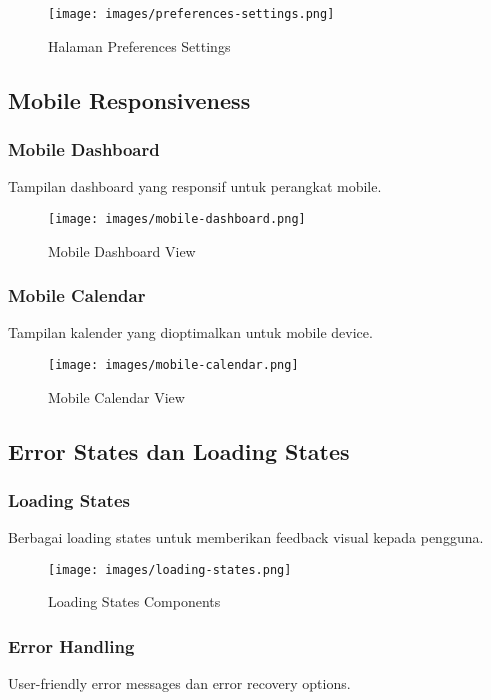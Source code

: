 \begin{figure}[H]
\centering
\texttt{[image: images/preferences-settings.png]}
\caption{Halaman Preferences Settings}
\label{fig:preferences-settings}
\end{figure}

\subsection{Mobile Responsiveness}

\subsubsection{Mobile Dashboard}
Tampilan dashboard yang responsif untuk perangkat mobile.

\begin{figure}[H]
\centering
\texttt{[image: images/mobile-dashboard.png]}
\caption{Mobile Dashboard View}
\label{fig:mobile-dashboard}
\end{figure}

\subsubsection{Mobile Calendar}
Tampilan kalender yang dioptimalkan untuk mobile device.

\begin{figure}[H]
\centering
\texttt{[image: images/mobile-calendar.png]}
\caption{Mobile Calendar View}
\label{fig:mobile-calendar}
\end{figure}

\subsection{Error States dan Loading States}

\subsubsection{Loading States}
Berbagai loading states untuk memberikan feedback visual kepada pengguna.

\begin{figure}[H]
\centering
\texttt{[image: images/loading-states.png]}
\caption{Loading States Components}
\label{fig:loading-states}
\end{figure}

\subsubsection{Error Handling}
User-friendly error messages dan error recovery options.

